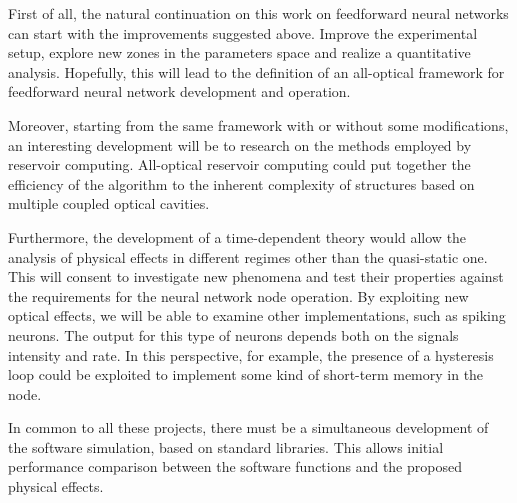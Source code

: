 First of all, the natural continuation on this work on feedforward neural networks can start with the improvements suggested above.
Improve the experimental setup, explore new zones in the parameters space and realize a quantitative analysis.
Hopefully, this will lead to the definition of an all-optical framework for feedforward neural network development and operation.

Moreover, starting from the same framework with or without some modifications, an interesting development will be to research on the methods employed by reservoir computing.
All-optical reservoir computing could put together the efficiency of the algorithm to the inherent complexity of structures based on multiple coupled optical cavities.

Furthermore, the development of a time-dependent theory would allow the analysis of physical effects in different regimes other than the quasi-static one.
This will consent to investigate new phenomena and test their properties against the requirements for the neural network node operation.
By exploiting new optical effects, we will be able to examine other implementations, such as spiking neurons.
The output for this type of neurons depends both on the signals intensity and rate.
In this perspective, for example, the presence of a hysteresis loop could be exploited to implement some kind of short-term memory in the node.

In common to all these projects, there must be a simultaneous development of the software simulation, based on standard libraries.
This allows initial performance comparison between the software functions and the proposed physical effects.
